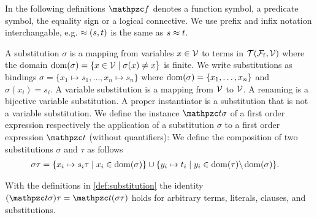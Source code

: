 
In the following definitions $\mcf$ denotes a function symbol, a predicate symbol, the equality sign or a logical connective.
We use prefix and infix notation interchangable, e.g.
$\approx(s,t)$ is the same as $s\approx t$.

\begin{definition}\label{def:substitution}
	A {\myem substitution} $\sigma$ is a mapping from variables $x\in{\mathcal V}$ to terms in ${{\mathcal T}({\mathcal F}_{\mathsf f},{\mathcal V})}$
	where the {\myem domain }$\operatorname{dom}(\sigma) = \{ x\in{\mathcal V}\mid\sigma(x) \neq x \}$ is finite.
	We write substitutions as bindings $\sigma=\{ x_1\mapsto s_1,\ldots,x_n\mapsto s_n \}$
	where $\operatorname{dom}(\sigma)=\{ x_1,\ldots,x_n \}$ and $\sigma(x_i)=s_i$.
	A {\myem variable substitution} is a mapping from ${\mathcal V}$ to ${\mathcal V}$.
	A {\myem renaming} is a bijective variable substitution.
	A {\myem proper instantiator} is a substitution that is not a variable substitution.
	We define the instance $\mct\sigma$ of a first order expression
	respectively the application of a substitution $\sigma$ to a first order expression $\mct$ (without quantifiers):
We define the {\myem composition} of two substitutions $\sigma$ and $\tau$ as follows
	\begin{align*}
		\sigma\tau&=\{ x_i\mapsto s_i\tau\mid x_i\in\operatorname{dom}(\sigma) \}
		\cup
		\{ y_i\mapsto t_i\mid y_i\in\operatorname{dom}(\tau) \backslash \operatorname{dom}(\sigma) \}.
	\end{align*}
	
\end{definition}

\begin{lemma}\label{lem:substitution}
	With the definitions in \ref{def:substitution} the identity
	$(\mct\sigma)\tau = \mct(\sigma\tau)$ holds for
	arbitrary terms, literals, clauses, and substitutions.
\end{lemma}